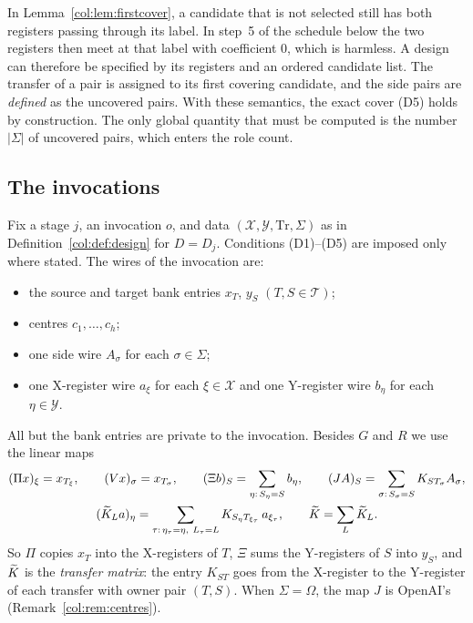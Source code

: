 \begin{remark}\label{col:rem:firstcover}
In Lemma~\ref{col:lem:firstcover}, a candidate that is not selected still has both registers passing
through its label. In step~5 of the schedule below the two registers then meet at that label with
coefficient $0$, which is harmless. A design can therefore be specified by its registers and an ordered
candidate list. The transfer of a pair is assigned to its first covering candidate, and the side pairs
are \emph{defined} as the uncovered pairs. With these semantics, the exact cover (D5) holds by
construction. The only global quantity that must be computed is the number $|\Sigma|$ of uncovered
pairs, which enters the role count.
\end{remark}

\subsection{The invocations}\label{col:sec:invocations}

Fix a stage $j$, an invocation $o$, and data $(\mathcal X,\mathcal Y,\mathrm{Tr},\Sigma)$ as in
Definition~\ref{col:def:design} for $D=D_j$. Conditions (D1)--(D5) are imposed only where stated. The
wires of the invocation are:
\begin{itemize}
\item the source and target bank entries $x_T$, $y_S$ $(T,S\in\mathcal T)$;
\item centres $c_1,\dots,c_h$;
\item one side wire $A_\sigma$ for each $\sigma\in\Sigma$;
\item one X-register wire $a_\xi$ for each $\xi\in\mathcal X$ and one Y-register wire $b_\eta$ for each
  $\eta\in\mathcal Y$.
\end{itemize}
All but the bank entries are private to the invocation. Besides $G$ and $R$ we use the linear maps
\begin{gather*}
  (\Pi x)_\xi=x_{T_\xi},\qquad (Vx)_\sigma=x_{T_\sigma},\qquad
  (\Xi b)_S=\sum_{\eta:\,S_\eta=S}b_\eta,\qquad (JA)_S=\sum_{\sigma:\,S_\sigma=S}K_{ST_\sigma}A_\sigma,\\
  (\widetilde K_La)_\eta=\sum_{\tau:\,\eta_\tau=\eta,\ L_\tau=L}K_{S_\eta T_{\xi_\tau}}\,a_{\xi_\tau},\qquad
  \widetilde K=\sum_{L}\widetilde K_L .
\end{gather*}
So $\Pi$ copies $x_T$ into the X-registers of $T$, $\Xi$ sums the Y-registers of $S$ into $y_S$, and
$\widetilde K$ is the \emph{transfer matrix}: the entry $K_{ST}$ goes from the X-register to the Y-register of
each transfer with owner pair $(T,S)$. When $\Sigma=\Omega$, the map $J$ is OpenAI's
(Remark~\ref{col:rem:centres}).

